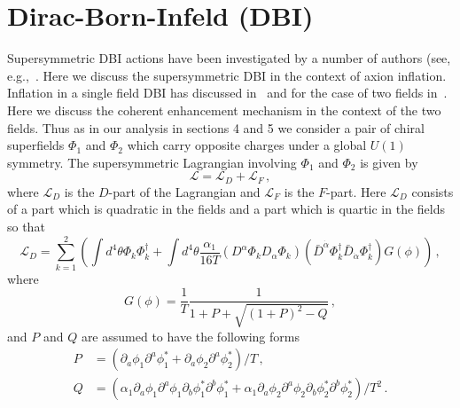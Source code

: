 \documentclass[12pt]{article}
\begin{document}
\section{Dirac-Born-Infeld (DBI) \label{sec:DBI}}
Supersymmetric DBI actions have been investigated by a number of authors (see, e.g.,~\cite{Khoury:2010gb, Khoury:2011da, Baumann:2011nk, Baumann:2011nm, Rocek:1997hi, Tseytlin:1999dj, Ito:2007hy, Billo:2008sp, Sasaki:2012ka, Aoki:2016tod}.
Here we discuss the supersymmetric DBI in the context of axion inflation.
Inflation in a single field DBI has discussed in~\cite{Sasaki:2012ka} and for the case of two fields in~\cite{Nath:2018xxe}.
Here we discuss the coherent enhancement mechanism in the context of the two fields.
Thus as in our analysis in sections 4 and 5 we consider a pair of chiral superfields $\Phi_1$ and $\Phi_2$ which carry opposite charges under a global $U\left(1\right)$ symmetry.
The supersymmetric Lagrangian involving $\Phi_1$ and $\Phi_2$ is given by
\begin{equation} \label{eq:DBI:lagrangianTerms}
  \mathcal{L} = \mathcal{L}_D + \mathcal{L}_F\,,
\end{equation}
where $\mathcal{L}_D$ is the $D$-part of the Lagrangian and $\mathcal{L}_F$ is the $F$-part.
Here $\mathcal{L}_D$ consists of a part which is quadratic in the fields and a part which is quartic in the fields so that
\begin{equation} \label{eq:DBI:lagrangianD}
  \mathcal{L}_D = \sum_{k = 1}^2 \left(\int d^4 \theta \Phi_k \Phi_k^\dagger
    + \int d^4 \theta \frac{\alpha_1}{16 T}
      \left(D^\alpha \Phi_k D_\alpha \Phi_k\right)
      \left({\bar D}^{\dot\alpha} \Phi_k^\dagger {\bar D}_{\dot\alpha} \Phi_k^\dagger\right)
      G\left(\phi\right)\right)\,,
\end{equation}
where
\begin{equation}
  G\left(\phi\right) = \frac{1}{T} \frac{1}{1 + P + \sqrt{\left(1 + P\right)^2 - Q}}\,,
\end{equation}
and $P$ and $Q$ are assumed to have the following forms
\begin{equation} \label{eq:DBI:PQ}
  \begin{aligned}
    P &= \left(
        \partial_a \phi_1 \partial^a \phi^*_1
      + \partial_a \phi_2 \partial^a \phi^*_2
    \right) / T\,,\\
    Q &= \left(
        \alpha_1 \partial_a \phi_1 \partial^a \phi_1 \partial_b \phi^*_1 \partial^b \phi^*_1
      + \alpha_1 \partial_a \phi_2 \partial^a \phi_2 \partial_b \phi^*_2 \partial^b \phi^*_2
    \right) / T^2\,.
  \end{aligned}
\end{equation}
\end{document}
